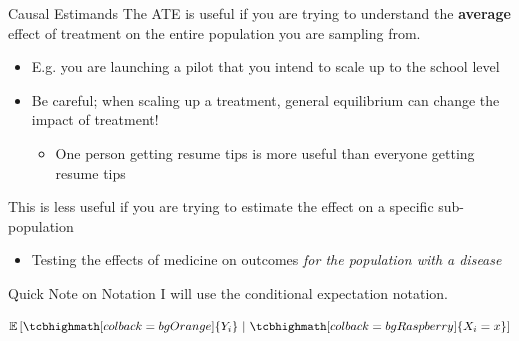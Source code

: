 \documentclass[aspectratio=169,t,11pt,table]{beamer}
\begin{document}
\begin{frame}{Causal Estimands}
  The ATE is useful if you are trying to understand the \textbf{average} effect of treatment on the entire population you are sampling from. 
  \begin{itemize}
    \item E.g. you are launching a pilot that you intend to scale up to the school level
    \pause
    \item Be careful; when scaling up a treatment, general equilibrium can change the impact of treatment! 
    \begin{itemize}
      \item One person getting resume tips is more useful than everyone getting resume tips
    \end{itemize}
  \end{itemize}

  \bigskip
  \pause
  This is less useful if you are trying to estimate the effect on a specific sub-population 
  \begin{itemize}
    \item Testing the effects of medicine on outcomes \emph{for the population with a disease}
  \end{itemize}
\end{frame}


\begin{frame}[fragile]{Quick Note on Notation}
  I will use the \alert{conditional expectation} notation.

  \vspace{1\bigskipamount}
  $$
    \mathbb{E} \left[
      \tcbhighmath[colback = bgOrange]{Y_i} \ \middle| \
      \tcbhighmath[colback = bgRaspberry]{X_i = x}
    \right]
  $$

\end{frame}
\end{document}
